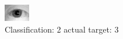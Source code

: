 \begin{figure}[h!]
\begin{center}
\includegraphics[width=0.60\columnwidth]{figures/ID1134_class_2_target_3.png}
\end{center}
\caption{ Classification: 2 actual target: 3}
\label{fig:ID1134_class_2_target_3}
\end{figure}
